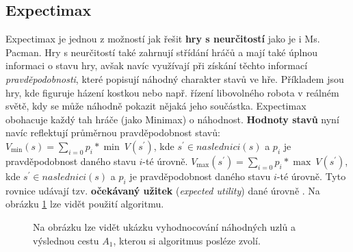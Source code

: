 \subsection{Expectimax}
Expectimax \cite{mas} je jednou z možností jak řešit \textbf{hry s neurčitostí} jako je i Ms. Pacman. Hry s neurčitostí také zahrnují střídání hráčů a mají také úplnou informaci o stavu hry, avšak navíc využívají při získání těchto informací \textit{pravděpodobnosti}, které popisují náhodný charakter stavů ve hře. Příkladem jsou hry, kde figuruje házení kostkou nebo např. řízení libovolného robota v reálném světě, kdy se může náhodně pokazit nějaká jeho součástka. Expectimax obohacuje každý tah hráče (jako Minimax) o náhodnost. \textbf{Hodnoty stavů} nyní navíc reflektují průměrnou pravděpodobnost stavů: \newline \newline
$V_{\min}(s) = \sum_{i=0} p_i * \min \: V(s^\prime)$, kde
\newline $s^\prime \in naslednici(s)$ a $p_i$ je pravděpodobnost daného stavu $i$-té úrovně.
\newline
\newline
$V_{\max}(s^\prime) = \sum_{i=0} p_i * \max \: V(s^\prime)$, kde 
\newline
$s^\prime \in naslednici(s)$ a $p_i$ je pravděpodobnost daného stavu $i$-té úrovně.
\newline
\newline
Tyto rovnice udávají tzv. \textbf{očekávaný užitek} (\textit{expected utility}) dané úrovně \cite{mas}. Na obrázku \ref{img:expectimax} lze vidět použití algoritmu.

\begin{figure}[h]
\begin{center}
	\caption{Na obrázku lze vidět ukázku vyhodnocování náhodných uzlů a výslednou cestu \boldmath$A_1$, kterou si algoritmus posléze zvolí.}
	\label{img:expectimax}
\end{center}
\end{figure}

